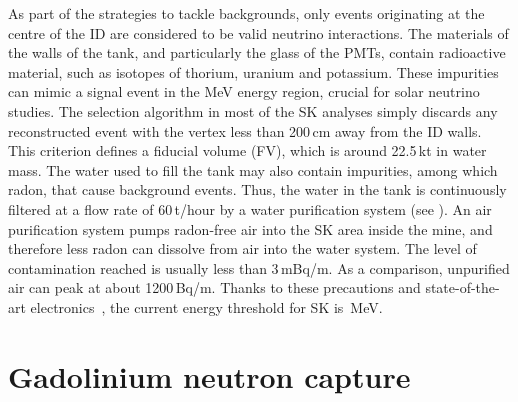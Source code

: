 As part of the strategies to tackle backgrounds, only events originating at the centre %
of the ID are considered to be valid neutrino interactions.
The materials of the walls of the tank, and particularly the glass of the PMTs, contain radioactive material, %
such as isotopes of thorium, uranium and potassium.
These impurities can mimic a signal event in the MeV energy region, crucial for solar neutrino studies.
The selection algorithm in most of the SK analyses simply discards any reconstructed event %
with the vertex less than 200\,cm away from the ID walls.
This criterion defines a fiducial volume (FV), which is around 22.5\,kt in water mass.
The water used to fill the tank may also contain impurities, among which radon, that cause background events.
Thus, the water in the tank is continuously filtered at a flow rate of 60\,t/hour by a water purification system (see ).
An air purification system pumps radon-free air into the SK area inside the mine, %
and therefore less radon can dissolve from air into the water system.
The level of contamination reached is usually less than 3\,mBq/m.
As a comparison, unpurified air can peak at about 1200\,Bq/m.
Thanks to these precautions and state-of-the-art electronics~\cite{Nishino:2009zu}, the current energy threshold for SK is \,MeV.





\section{Gadolinium neutron capture}
\label{sec:gadolinium}

